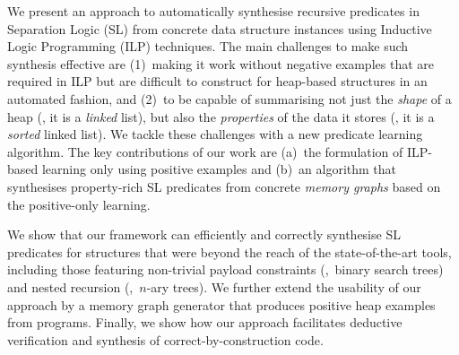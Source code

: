 We present an approach to automatically synthesise recursive
predicates in Separation Logic (SL) from concrete data structure
instances using Inductive Logic Programming (ILP) techniques.
%
The main challenges to make such synthesis effective are (1)~making it
work without negative examples that are required in ILP but are
difficult to construct for heap-based structures in an automated
fashion, and (2)~to be capable of summarising not just the
\emph{shape} of a heap (\eg, it is a \emph{linked} list), but also the
\emph{properties} of the data it stores (\eg, it is a \emph{sorted}
linked list).
%
We tackle these challenges with a new predicate learning algorithm.
The key contributions of our work are (a)~the formulation of ILP-based
learning only using positive examples and (b)~an algorithm that
synthesises property-rich SL predicates from concrete \emph{memory
graphs} based on the positive-only learning.

We show that our framework can efficiently and correctly synthesise SL
predicates for structures that were beyond the reach of the
state-of-the-art tools, including those featuring non-trivial payload
constraints (\eg,~binary search trees) and nested recursion
(\eg,~$n$-ary trees).
%
We further extend the usability of our approach by a memory graph
generator that produces positive heap examples from programs. Finally,
we show how our approach facilitates deductive verification and
synthesis of correct-by-construction code.

